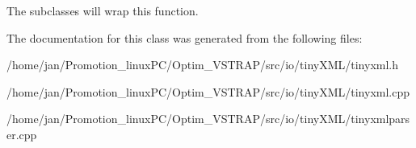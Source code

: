 The subclasses will wrap this function. 

The documentation for this class was generated from the following files\+:\begin{DoxyCompactItemize}
\item 
/home/jan/\+Promotion\+\_\+linux\+P\+C/\+Optim\+\_\+\+V\+S\+T\+R\+A\+P/src/io/tiny\+X\+M\+L/tinyxml.\+h\item 
/home/jan/\+Promotion\+\_\+linux\+P\+C/\+Optim\+\_\+\+V\+S\+T\+R\+A\+P/src/io/tiny\+X\+M\+L/tinyxml.\+cpp\item 
/home/jan/\+Promotion\+\_\+linux\+P\+C/\+Optim\+\_\+\+V\+S\+T\+R\+A\+P/src/io/tiny\+X\+M\+L/tinyxmlparser.\+cpp\end{DoxyCompactItemize}
